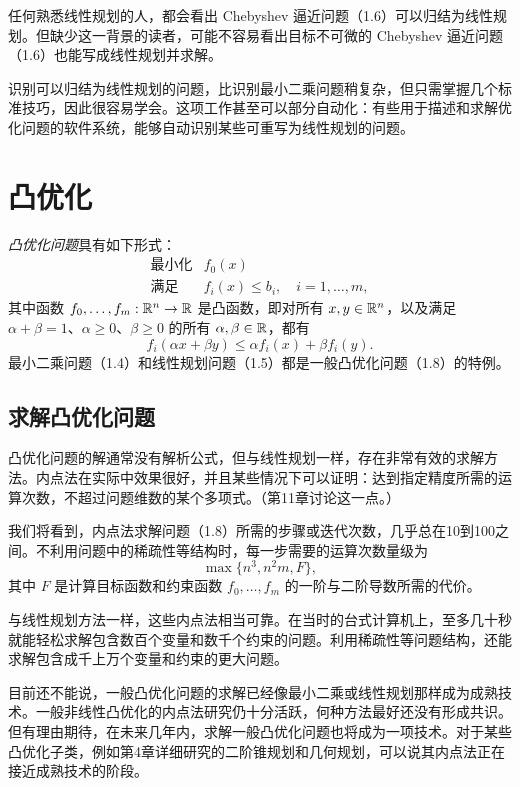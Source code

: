 任何熟悉线性规划的人，都会看出 Chebyshev 逼近问题（1.6）可以归结为线性规划。但缺少这一背景的读者，可能不容易看出目标不可微的 Chebyshev 逼近问题（1.6）也能写成线性规划并求解。

识别可以归结为线性规划的问题，比识别最小二乘问题稍复杂，但只需掌握几个标准技巧，因此很容易学会。这项工作甚至可以部分自动化：有些用于描述和求解优化问题的软件系统，能够自动识别某些可重写为线性规划的问题。

\section{凸优化}
\emph{凸优化问题}具有如下形式：
\begin{equation}
\begin{array}{ll}
\text{最小化}&f_0(x)\\
\text{满足}&f_i(x)\le b_i,\quad i=1,\ldots,m,
\end{array}\tag{1.8}
\end{equation}
其中函数 $f_0,\ldots,f_m:\mathbb R^n\to\mathbb R$ 是凸函数，即对所有 $x,y\in\mathbb R^n$，以及满足 $\alpha+\beta=1$、$\alpha\ge0$、$\beta\ge0$ 的所有 $\alpha,\beta\in\mathbb R$，都有
\[
 f_i(\alpha x+\beta y)\le\alpha f_i(x)+\beta f_i(y).
\]
最小二乘问题（1.4）和线性规划问题（1.5）都是一般凸优化问题（1.8）的特例。

\subsection{求解凸优化问题}
凸优化问题的解通常没有解析公式，但与线性规划一样，存在非常有效的求解方法。内点法在实际中效果很好，并且某些情况下可以证明：达到指定精度所需的运算次数，不超过问题维数的某个多项式。（第11章讨论这一点。）

我们将看到，内点法求解问题（1.8）所需的步骤或迭代次数，几乎总在10到100之间。不利用问题中的稀疏性等结构时，每一步需要的运算次数量级为
\[
 \max\{n^3,n^2m,F\},
\]
其中 $F$ 是计算目标函数和约束函数 $f_0,\ldots,f_m$ 的一阶与二阶导数所需的代价。

与线性规划方法一样，这些内点法相当可靠。在当时的台式计算机上，至多几十秒就能轻松求解包含数百个变量和数千个约束的问题。利用稀疏性等问题结构，还能求解包含成千上万个变量和约束的更大问题。

目前还不能说，一般凸优化问题的求解已经像最小二乘或线性规划那样成为成熟技术。一般非线性凸优化的内点法研究仍十分活跃，何种方法最好还没有形成共识。但有理由期待，在未来几年内，求解一般凸优化问题也将成为一项技术。对于某些凸优化子类，例如第4章详细研究的二阶锥规划和几何规划，可以说其内点法正在接近成熟技术的阶段。

